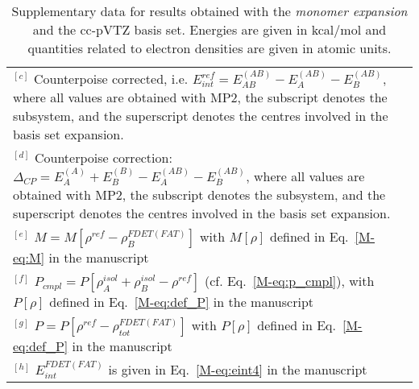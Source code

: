 \documentclass[amsmath,amssymb,preprint,aip,jcp]{revtex4-1}
\begin{document}
\begin{table}[H]
\begin{center}
{\begin{tabular}{|l|l|l|l|l|l|l|l|l|l|}
\multicolumn{10}{p{1.0\textwidth}}{$^{[c]}$ Counterpoise corrected, i.e. $E_{int}^{ref} = E_{AB}^{(AB)} - E_{A}^{(AB)} - E_{B}^{(AB)}$, where all values are obtained with MP2, the subscript denotes the subsystem, and the superscript denotes the centres involved in the basis set expansion.} \\
\multicolumn{10}{p{1.0\textwidth}}{$^{[d]}$ Counterpoise correction: $\Delta_{CP} = E_{A}^{(A)} + E_{B}^{(B)} - E_{A}^{(AB)} - E_{B}^{(AB)}$, where all values are obtained with MP2, the subscript denotes the subsystem, and the superscript denotes the centres involved in the basis set expansion.} \\
\multicolumn{10}{p{1.0\textwidth}}{$^{[e]}$ $M=M[\rho^{ref} - \rho^{FDET(FAT)}_{B}]$ with $M[\rho]$ defined in Eq.~\ref{M-eq:M} in the manuscript}\\
\multicolumn{10}{p{1.0\textwidth}}{$^{[f]}$ $P_{cmpl}=P[\rho_A^{isol}+\rho_B^{isol} - \rho^{ref}]$ (cf. Eq.~\ref{M-eq:p_cmpl}), with $P[\rho]$ defined in Eq.~\ref{M-eq:def_P} in the manuscript}\\
\multicolumn{10}{p{1.0\textwidth}}{$^{[g]}$ $P=P[\rho^{ref} - \rho_{tot}^{FDET(FAT)}]$ with $P[\rho]$ defined in Eq.~\ref{M-eq:def_P} in the manuscript}\\
\multicolumn{10}{p{1.0\textwidth}}{$^{[h]}$ $E^{FDET(FAT)}_{int}$ is given in Eq.~\ref{M-eq:eint4} in the manuscript}\\
\end{tabular}
}
\end{center}
\caption{Supplementary data for results obtained with the \textit{monomer expansion} and the cc-pVTZ basis set. Energies are given in kcal/mol and quantities related to electron densities are given in atomic units.}
\end{table}
\end{document}
